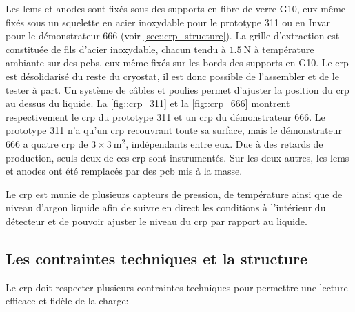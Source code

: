             Les \glspl{lem} et anodes sont fixés sous des supports en fibre de verre G10, eux même fixés sous un squelette en acier inoxydable pour le prototype 311 ou en Invar pour le démonstrateur 666 (voir \autoref{sec::crp_structure}). La grille d'extraction est constituée de fils d'acier inoxydable, chacun tendu à $\SI{1.5}{\newton}$ à température ambiante sur des \glspl{pcb}, eux même fixés sur les bords des supports en G10. Le \gls{crp} est désolidarisé du reste du cryostat, il est donc possible de l'assembler et de le tester à part. Un système de câbles et poulies permet d'ajuster la position du \gls{crp} au dessus du liquide. La \autoref{fig::crp_311} et la \autoref{fig::crp_666} montrent respectivement le \gls{crp} du prototype 311 et un \gls{crp} du démonstrateur 666. Le prototype 311 n'a qu'un \gls{crp} recouvrant toute sa surface, mais le démonstrateur 666 a quatre \gls{crp} de $3\times\SI{3}{\meter\squared}$, indépendants entre eux. Due à des retards de production, seuls deux de ces \gls{crp} sont instrumentés. Sur les deux autres, les \glspl{lem} et anodes ont été remplacés par des \gls{pcb} mis à la masse.
            
            Le \gls{crp} est munie de plusieurs capteurs de pression, de température ainsi que de niveau d'argon liquide afin de suivre en direct les conditions à l'intérieur du détecteur et de pouvoir ajuster le niveau du \gls{crp} par rapport au liquide.
        
        \subsection{Les contraintes techniques et la structure}\label{sec::crp_structure}
            
            Le \gls{crp} doit respecter plusieurs contraintes techniques \cite{talk_crp} pour permettre une lecture efficace et fidèle de la charge:
            
